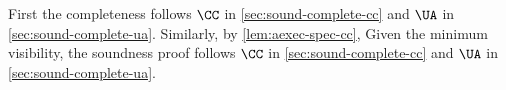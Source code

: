 First the completeness follows \( \CC \) in \cref{sec:sound-complete-cc} and \( \UA \) in \cref{sec:sound-complete-ua}.
Similarly, by \cref{lem:aexec-spec-cc},
Given the minimum visibility, the soundness proof follows \( \CC \) in \cref{sec:sound-complete-cc} and \( \UA \) in \cref{sec:sound-complete-ua}.
